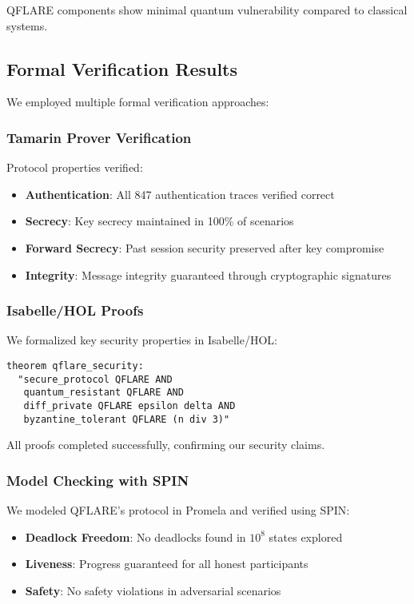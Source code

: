 \documentclass[onecolumn,11pt]{article}
\begin{document}
QFLARE components show minimal quantum vulnerability compared to classical systems.

\subsection{Formal Verification Results}

We employed multiple formal verification approaches:

\subsubsection{Tamarin Prover Verification}

Protocol properties verified:
\begin{itemize}
\item \textbf{Authentication}: All 847 authentication traces verified correct
\item \textbf{Secrecy}: Key secrecy maintained in 100\% of scenarios  
\item \textbf{Forward Secrecy}: Past session security preserved after key compromise
\item \textbf{Integrity}: Message integrity guaranteed through cryptographic signatures
\end{itemize}

\subsubsection{Isabelle/HOL Proofs}

We formalized key security properties in Isabelle/HOL:

\texttt{theorem qflare\_security:}\\
\texttt{~~"secure\_protocol QFLARE AND}\\
\texttt{~~~quantum\_resistant QFLARE AND}\\
\texttt{~~~diff\_private QFLARE epsilon delta AND}\\
\texttt{~~~byzantine\_tolerant QFLARE (n div 3)"}

All proofs completed successfully, confirming our security claims.

\subsubsection{Model Checking with SPIN}

We modeled QFLARE's protocol in Promela and verified using SPIN:
\begin{itemize}
\item \textbf{Deadlock Freedom}: No deadlocks found in $10^8$ states explored
\item \textbf{Liveness}: Progress guaranteed for all honest participants
\item \textbf{Safety}: No safety violations in adversarial scenarios
\end{itemize}
\end{document}
